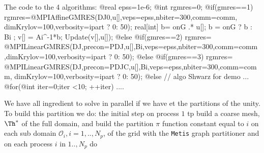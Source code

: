\documentclass[a4paper,twoside,12pt]{book}
\begin{document}
\eFF  


The code to the 4 algorithms:
\bFF
@real epss=1e-6;
@int rgmres=0;
@if(gmres==1)
  {
   rgmres=@MPIAffineGMRES(DJ0,u[],veps=epss,nbiter=300,comm=comm,
                         dimKrylov=100,verbosity=ipart ? 0: 50);
   real[int] b= onG .* u[];
   b  = onG ? b : Bi ;
   v[] = Ai^-1*b;	
   Update(v[],u[]);
  }
@else @if(gmres==2)
  rgmres= @MPILinearGMRES(DJ,precon=PDJ,u[],Bi,veps=epss,nbiter=300,comm=comm
                        ,dimKrylov=100,verbosity=ipart ? 0: 50);
@else @if(gmres==3)
   rgmres= @MPILinearGMRES(DJ,precon=PDJC,u[],Bi,veps=epss,nbiter=300,comm=comm,
                          dimKrylov=100,verbosity=ipart ? 0: 50);
@else // algo Shwarz for demo ...
   @for(@int iter=0;iter <10; ++iter)
     ....
    
\eFF

We  have all ingredient to solve in parallel if we have et the partitions of the unity.
To build this partition we do:
the initial step 
on process $1$ tp 
build a coarse mesh, $\Th^*$ of the full domain,
and build the partition $\pi$  function constant equal to $i$ on each 
sub domain $\mathcal{O}_i, i =1 ,.., N_p$,  of the grid with the \texttt{Metis} graph  partitioner  \cite{metis}
 and on each process $i$ in $1..,N_p$ do 
\end{document}

